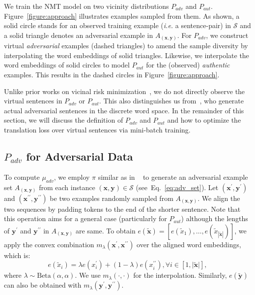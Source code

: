 \documentclass[11pt,a4paper]{article}
\def\S{\mathcal{S}} \def\cS{\vert \mathcal{S} \vert}
\def\bx{\mathbf{x}} \def\bxp{\mathbf{x}^{\prime}} \def\bxpp{\mathbf{x}^{\prime\prime}} \def\tbx{\tilde{\mathbf{x}}} \def\hbx{\hat{\mathbf{x}}} \def\ex{e(\mathbf{x})}
\def\tex{e({\tilde{\mathbf{x}}})}
\def\by{\mathbf{y}} \def\byp{\mathbf{y}^{\prime}} \def\bypp{\mathbf{y}^{\prime\prime}} \def\tby{\tilde{\mathbf{y}}} \def\hby{\hat{\mathbf{y}}} \def\ey{e(\mathbf{y})}
\newcommand{\ie}{\emph{i.e. }} \newcommand{\Ie}{\emph{I.e}}
\begin{document}
We train the NMT model on two vicinity distributions $P_{adv}$ and $P_{aut}$. Figure~\ref{figure:approach} illustrates examples sampled from them.
As shown, a solid circle stands for an observed training example (\ie a sentence-pair) in $\S$ and a solid triangle denotes an adversarial example in $A_{(\bx, \by)}$. For $P_{adv}$, we construct virtual \emph{adversarial} examples (dashed triangles) to amend the sample diversity by interpolating the word embeddings of solid triangles. Likewise, we interpolate the word embeddings of solid circles to model $P_{aut}$ for the (observed) \emph{authentic} examples. This results in the dashed circles in Figure~\ref{figure:approach}.



Unlike prior works on vicinal risk minimization~\cite{chapelle2001vicinal,Zhang:18}, we do not directly observe the virtual sentences in $P_{adv}$ or $P_{aut}$. This also distinguishes us from~\citet{Cheng:19}, who generate actual adversarial sentences in the discrete word space. In the remainder of this section, we will discuss the definition of $P_{adv}$ and $P_{aut}$ and how to optimize the translation loss over virtual sentences via mini-batch training.

\subsection{$P_{adv}$ for Adversarial Data}


To compute $\mu_{adv}$, we employ $\pi$ similar as in ~\cite{Cheng:19} to generate 
an adversarial example set $A_{(\bx, \by)}$ from each instance $(\bx,\by) \in \S$ (see~Eq.~\eqref{eq:adv_set}). Let $(\bxp, \byp)$ and $(\bxpp, \bypp)$ be two examples randomly sampled from $A_{(\bx, \by)}$. We align the two sequences by padding tokens to the end of the shorter sentence. Note that this operation aims for a general case (particularly for $P_{aut}$) although the lengths of $\byp$ and $\bypp$ in $A_{(\bx, \by)}$ are same.
To obtain $\tex = [e(\tilde{x}_{1}), \ldots, e(\tilde{x}_{|\tbx|})]$, we apply the convex combination $m_{\lambda}(\bxp, \bxpp)$ over the aligned word embeddings, which is:
\begin{equation}
e(\tilde{x}_{i}) \!=\! \lambda e(x^{\prime}_i) + (1 - \lambda) e(x^{\prime\prime}_{i}),  \forall i \in [1, \vert \tbx \vert ], \label{eq:mix_src}
\end{equation}
where $\lambda \sim \text{Beta}(\alpha, \alpha)$. We use $m_{\lambda}(\cdot, \cdot)$ for the interpolation. Similarly, $e(\tby)$ can also be obtained with $m_{\lambda}(\byp, \bypp)$. 
\end{document}
